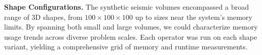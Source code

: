 \vspace{1em}
\noindent
\textbf{Shape Configurations.}
The synthetic seismic volumes encompassed a broad range of \ac{3D} shapes, from $100 \times 100 \times 100$ up to sizes near the system’s memory limits.
By spanning both small and large volumes, we could characterize memory usage trends across diverse problem scales.
Each operator was run on each shape variant, yielding a comprehensive grid of memory and runtime measurements.